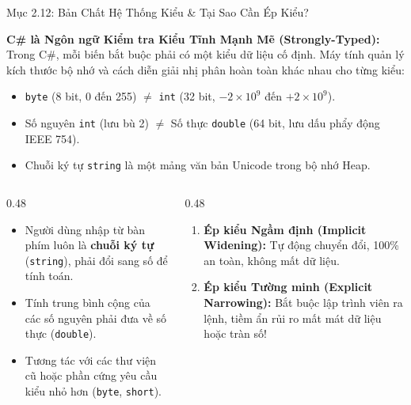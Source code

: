 \documentclass[aspectratio=169, 10pt]{beamer}
\begin{document}
\begin{frame}{Mục 2.12: Bản Chất Hệ Thống Kiểu \& Tại Sao Cần Ép Kiểu?}
  \begin{block}{\textbf{C\# là Ngôn ngữ Kiểm tra Kiểu Tĩnh Mạnh Mẽ (Strongly-Typed):}}
    Trong C\#, mỗi biến bắt buộc phải có một kiểu dữ liệu cố định. Máy tính quản lý kích thước bộ nhớ và cách diễn giải nhị phân hoàn toàn khác nhau cho từng kiểu:
    \begin{itemize}\small
      \item \texttt{byte} (8 bit, 0 đến 255) $\ne$ \texttt{int} (32 bit, $-2 \times 10^9$ đến $+2 \times 10^9$).
      \item Số nguyên \texttt{int} (lưu bù 2) $\ne$ Số thực \texttt{double} (64 bit, lưu dấu phẩy động IEEE 754).
      \item Chuỗi ký tự \texttt{string} là một mảng văn bản Unicode trong bộ nhớ Heap.
    \end{itemize}
  \end{block}

  \begin{columns}[T]
    \begin{column}{0.48\textwidth}
      \begin{tcolorbox}[colback=UniLightBlue!30,colframe=UniBlue,title=\textbf{Nhu cầu thực tế cần chuyển đổi kiểu},fonttitle=\small\bfseries]
        \begin{itemize}\footnotesize
          \item Người dùng nhập từ bàn phím luôn là \textbf{chuỗi ký tự} (\texttt{string}), phải đổi sang số để tính toán.
          \item Tính trung bình cộng của các số nguyên phải đưa về số thực (\texttt{double}).
          \item Tương tác với các thư viện cũ hoặc phần cứng yêu cầu kiểu nhỏ hơn (\texttt{byte}, \texttt{short}).
        \end{itemize}
      \end{tcolorbox}
    \end{column}

    \begin{column}{0.48\textwidth}
      \begin{tcolorbox}[colback=CSharpPurple!10,colframe=CSharpPurple,title=\textbf{2 Cơ chế chuyển đổi cốt lõi},fonttitle=\small\bfseries]
        \begin{enumerate}\footnotesize
          \item \textbf{Ép kiểu Ngầm định (Implicit Widening):} Tự động chuyển đổi, 100\% an toàn, không mất dữ liệu.
          \item \textbf{Ép kiểu Tường minh (Explicit Narrowing):} Bắt buộc lập trình viên ra lệnh, tiềm ẩn rủi ro mất mát dữ liệu hoặc tràn số!
        \end{enumerate}
      \end{tcolorbox}
    \end{column}
  \end{columns}
\end{frame}
\end{document}

